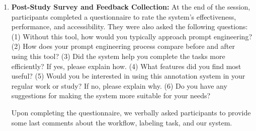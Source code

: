\begin{enumerate}

\item 
\textbf{Post-Study Survey and Feedback Collection:}
At the end of the session, participants completed a questionnaire to rate the system's effectiveness, performance, and accessibility. They were also asked the following questions:
(1) Without this tool, how would you typically approach prompt engineering?
(2) How does your prompt engineering process compare before and after using this tool?
(3) Did the system help you complete the tasks more efficiently? If yes, please explain how.
(4) What features did you find most useful?
(5) Would you be interested in using this annotation system in your regular work or study? If no, please explain why.
(6) Do you have any suggestions for making the system more suitable for your needs?

Upon completing the questionnaire, we verbally asked participants to provide some last comments about the workflow, labeling task, and our system.



\end{enumerate}




